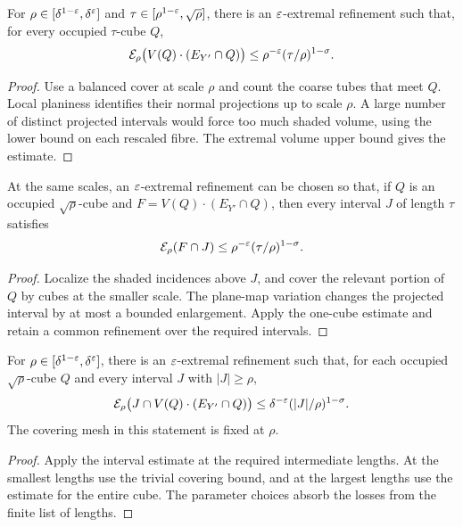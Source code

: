 \begin{lemma}
\label{lem:grain-cube}
For $\rho\in[\delta^{1-\varepsilon},\delta^\varepsilon]$ and
$\tau\in[\rho^{1-\varepsilon},\sqrt\rho]$, there is an $\varepsilon$-extremal
refinement such that, for every occupied $\tau$-cube $Q$,
\[
 \mathcal{E}_\rho\bigl(V(Q)\cdot(E_{Y'}\cap Q)\bigr)
       \leq\rho^{-\varepsilon}(\tau/\rho)^{1-\sigma}.
\]
\end{lemma}
\begin{proof}
Use a balanced cover at scale $\rho$ and count the coarse tubes that
meet $Q$. Local planiness identifies their normal projections up to
scale $\rho$. A large number of distinct projected intervals would
force too much shaded volume, using the lower bound on each
rescaled fibre. The extremal volume upper bound gives the estimate.
\end{proof}

\begin{lemma}
\label{lem:grain-interval}
At the same scales, an $\varepsilon$-extremal refinement can be chosen so
that, if $Q$ is an occupied $\sqrt\rho$-cube and
$F=V(Q)\cdot(E_{Y'}\cap Q)$, then every interval $J$ of length
$\tau$ satisfies
\[
                       \mathcal{E}_\rho(F\cap J)
                       \leq\rho^{-\varepsilon}(\tau/\rho)^{1-\sigma}.
\]
\end{lemma}
\begin{proof}
Localize the shaded incidences above $J$, and cover the relevant
portion of $Q$ by cubes at the smaller scale. The plane-map variation
changes the projected interval by at most a bounded enlargement.
Apply the one-cube estimate and retain a common refinement over the
required intervals.
\end{proof}

\begin{lemma}
\label{lem:grain-ad-one-scale}
For $\rho\in[\delta^{1-\varepsilon},\delta^\varepsilon]$, there is an
$\varepsilon$-extremal refinement such that, for each occupied
$\sqrt\rho$-cube $Q$ and every interval $J$ with $|J|\geq\rho$,
\[
 \mathcal{E}_\rho\bigl(J\cap V(Q)\cdot(E_{Y'}\cap Q)\bigr)
       \leq\delta^{-\varepsilon}(|J|/\rho)^{1-\sigma}.
\]
The covering mesh in this statement is fixed at $\rho$.
\end{lemma}
\begin{proof}
Apply the interval estimate at the required intermediate lengths.
At the smallest lengths use the trivial covering bound, and at the
largest lengths use the estimate for the entire cube. The parameter
choices absorb the losses from the finite list of lengths.
\end{proof}


